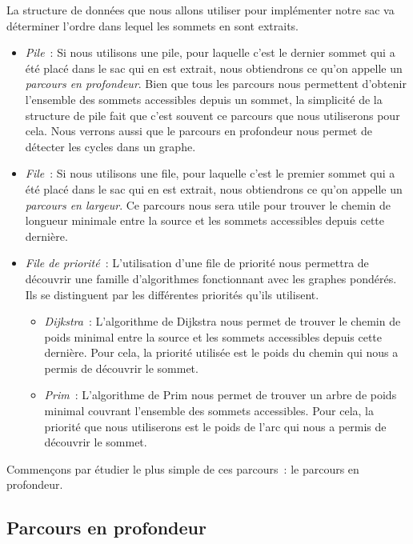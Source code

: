 \documentclass{magnolia}
\begin{document}
La structure de données que nous allons utiliser pour implémenter notre sac va déterminer
l'ordre dans lequel les sommets en sont extraits.
\begin{itemize}
\item \emph{Pile}~: Si nous utilisons une pile, pour laquelle c'est le dernier sommet qui
  a été placé dans le sac qui en est extrait, nous obtiendrons ce qu'on appelle
  un \emph{parcours en profondeur}. Bien que tous les parcours nous permettent
  d'obtenir l'ensemble des sommets accessibles depuis un sommet, la simplicité de la
  structure de pile fait que c'est souvent ce parcours que nous utiliserons pour cela.
  Nous verrons aussi que le parcours en profondeur nous permet de détecter les cycles
  dans un graphe.
\item \emph{File}~: Si nous utilisons une file, pour laquelle c'est le premier sommet
  qui a été placé dans le sac qui en est extrait, nous obtiendrons ce qu'on appelle
  un \emph{parcours en largeur}. Ce parcours nous sera utile pour trouver le chemin
  de longueur minimale entre la source et les sommets accessibles depuis cette
  dernière.
\item \emph{File de priorité}~: L'utilisation d'une file de priorité nous permettra
  de découvrir une famille d'algorithmes fonctionnant avec les graphes pondérés. Ils
  se distinguent par les différentes priorités qu'ils utilisent.
  \begin{itemize}
  \item \emph{Dijkstra}~: L'algorithme de Dijkstra nous permet de trouver le chemin
    de poids minimal entre la source et les sommets accessibles depuis cette dernière.
    Pour cela, la
    priorité utilisée est le poids du chemin qui nous a permis de découvrir le sommet.
  \item \emph{Prim}~: L'algorithme de Prim nous permet de trouver un arbre de poids minimal
    couvrant l'ensemble des sommets accessibles. Pour cela, la priorité que nous utiliserons est
    le poids de l'arc qui nous a permis de découvrir le sommet.
  \end{itemize}
\end{itemize}

\vspace{2ex}
Commençons par étudier le plus simple de ces parcours~: le parcours en profondeur.

\subsection{Parcours en profondeur}
\end{document}
